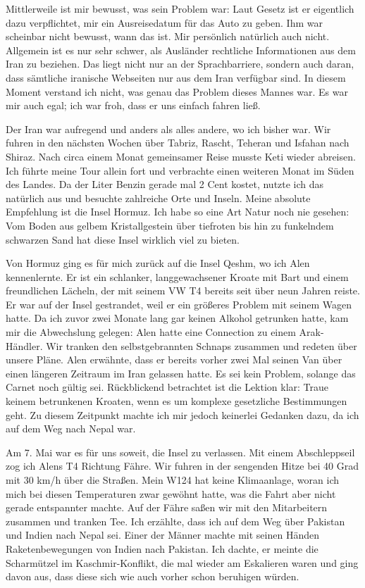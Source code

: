 Mittlerweile ist mir bewusst, was sein Problem war: Laut Gesetz ist er eigentlich dazu verpflichtet, mir ein Ausreisedatum für das Auto zu geben. Ihm war scheinbar nicht bewusst, wann das ist. Mir persönlich natürlich auch nicht. Allgemein ist es nur sehr schwer, als Ausländer rechtliche Informationen aus dem Iran zu beziehen. Das liegt nicht nur an der Sprachbarriere, sondern auch daran, dass sämtliche iranische Webseiten nur aus dem Iran verfügbar sind. In diesem Moment verstand ich nicht, was genau das Problem dieses Mannes war. Es war mir auch egal; ich war froh, dass er uns einfach fahren ließ.

Der Iran war aufregend und anders als alles andere, wo ich bisher war. Wir fuhren in den nächsten Wochen über Tabriz, Rascht, Teheran und Isfahan nach Shiraz. Nach circa einem Monat gemeinsamer Reise musste Keti wieder abreisen. Ich führte meine Tour allein fort und verbrachte einen weiteren Monat im Süden des Landes. Da der Liter Benzin gerade mal 2 Cent kostet, nutzte ich das natürlich aus und besuchte zahlreiche Orte und Inseln. Meine absolute Empfehlung ist die Insel Hormuz. Ich habe so eine Art Natur noch nie gesehen: Vom Boden aus gelbem Kristallgestein über tiefroten bis hin zu funkelndem schwarzen Sand hat diese Insel wirklich viel zu bieten.

Von Hormuz ging es für mich zurück auf die Insel Qeshm, wo ich Alen kennenlernte. Er ist ein schlanker, langgewachsener Kroate mit Bart und einem freundlichen Lächeln, der mit seinem VW T4 bereits seit über neun Jahren reiste. Er war auf der Insel gestrandet, weil er ein größeres Problem mit seinem Wagen hatte. Da ich zuvor zwei Monate lang gar keinen Alkohol getrunken hatte, kam mir die Abwechslung gelegen: Alen hatte eine Connection zu einem Arak-Händler. Wir tranken den selbstgebrannten Schnaps zusammen und redeten über unsere Pläne. Alen erwähnte, dass er bereits vorher zwei Mal seinen Van über einen längeren Zeitraum im Iran gelassen hatte. Es sei kein Problem, solange das Carnet noch gültig sei. Rückblickend betrachtet ist die Lektion klar: Traue keinem betrunkenen Kroaten, wenn es um komplexe gesetzliche Bestimmungen geht. Zu diesem Zeitpunkt machte ich mir jedoch keinerlei Gedanken dazu, da ich auf dem Weg nach Nepal war.

Am 7. Mai war es für uns soweit, die Insel zu verlassen. Mit einem Abschleppseil zog ich Alens T4 Richtung Fähre. Wir fuhren in der sengenden Hitze bei 40 Grad mit 30 km/h über die Straßen. Mein W124 hat keine Klimaanlage, woran ich mich bei diesen Temperaturen zwar gewöhnt hatte, was die Fahrt aber nicht gerade entspannter machte. Auf der Fähre saßen wir mit den Mitarbeitern zusammen und tranken Tee. Ich erzählte, dass ich auf dem Weg über Pakistan und Indien nach Nepal sei. Einer der Männer machte mit seinen Händen Raketenbewegungen von Indien nach Pakistan. Ich dachte, er meinte die Scharmützel im Kaschmir-Konflikt, die mal wieder am Eskalieren waren und ging davon aus, dass diese sich wie auch vorher schon beruhigen würden.

